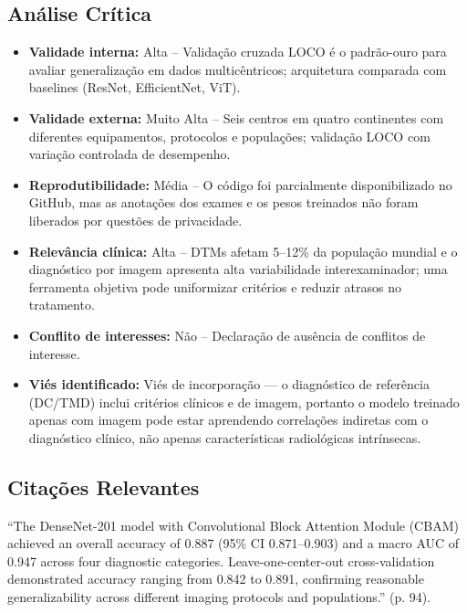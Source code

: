 \subsection{Análise Crítica}
\begin{itemize}
  \item \textbf{Validade interna:} Alta -- Validação cruzada LOCO é o
        padrão-ouro para avaliar generalização em dados multicêntricos;
        arquitetura comparada com baselines (ResNet, EfficientNet, ViT).
  \item \textbf{Validade externa:} Muito Alta -- Seis centros em quatro
        continentes com diferentes equipamentos, protocolos e populações;
        validação LOCO com variação controlada de desempenho.
  \item \textbf{Reprodutibilidade:} Média -- O código foi parcialmente
        disponibilizado no GitHub, mas as anotações dos exames e os
        pesos treinados não foram liberados por questões de privacidade.
  \item \textbf{Relevância clínica:} Alta -- DTMs afetam 5--12\% da
        população mundial e o diagnóstico por imagem apresenta alta
        variabilidade interexaminador; uma ferramenta objetiva pode
        uniformizar critérios e reduzir atrasos no tratamento.
  \item \textbf{Conflito de interesses:} Não -- Declaração de ausência de
        conflitos de interesse.
  \item \textbf{Viés identificado:} Viés de incorporação — o diagnóstico
        de referência (DC/TMD) inclui critérios clínicos e de imagem,
        portanto o modelo treinado apenas com imagem pode estar aprendendo
        correlações indiretas com o diagnóstico clínico, não apenas
        características radiológicas intrínsecas.
\end{itemize}

\subsection{Citações Relevantes}
\begin{citacao}
``The DenseNet-201 model with Convolutional Block Attention Module (CBAM)
achieved an overall accuracy of 0.887 (95\% CI 0.871--0.903) and a macro
AUC of 0.947 across four diagnostic categories. Leave-one-center-out
cross-validation demonstrated accuracy ranging from 0.842 to 0.891,
confirming reasonable generalizability across different imaging protocols
and populations.'' (p. 94).
\end{citacao}

